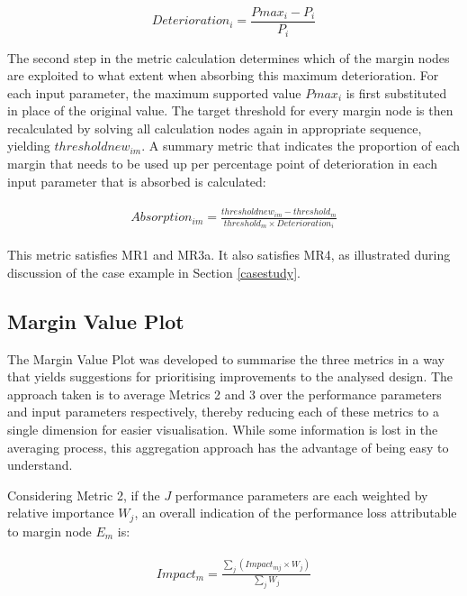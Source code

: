 \begin{equation} \label{eq:deteriorationeq}
Deterioration_i = \frac{Pmax_{i} - P_i}{P_i} 
\end{equation}

The second step in the metric calculation determines which of the margin nodes are exploited to what extent when absorbing this maximum deterioration. For each input parameter, the maximum supported value $Pmax_{i}$ is first substituted in place of the original value. The target threshold for every margin node is then recalculated by solving all calculation nodes again in appropriate sequence, yielding $thresholdnew_{im}$. A summary metric that indicates the proportion of each margin that needs to be used up per percentage point of deterioration in each input parameter that is absorbed is calculated:

\begin{align}
\begin{split}
\label{eq:absorptioneq}
Absorption_{im} = \frac{thresholdnew_{im} - threshold_m}  {threshold_m \times Deterioration_i}
\end{split}
\end{align}



This metric satisfies MR1 and MR3a. It also satisfies MR4, as illustrated during discussion of the case example in Section \ref{casestudy}.

\subsection{Margin Value Plot}\label{marginplot}

The Margin Value Plot was developed to summarise the three metrics in a way that yields suggestions for prioritising improvements to the analysed design. The approach taken is to average Metrics 2 and 3 over the performance parameters and input parameters respectively, thereby reducing each of these metrics to a single dimension for easier visualisation. While some information is lost in the averaging process, this aggregation approach has the advantage of being easy to understand.

Considering Metric 2, if the $J$ performance parameters are each weighted by relative importance $W_j$, an overall indication of the performance loss attributable to margin node $E_m$ is:

\begin{align}
\begin{split}
\label{eq:weightedimpact}
Impact_{m}=\frac { \sum_j{(Impact_{mj} \times W_j)}} { \sum_j{W_j} }
\end{split}
\end{align}


